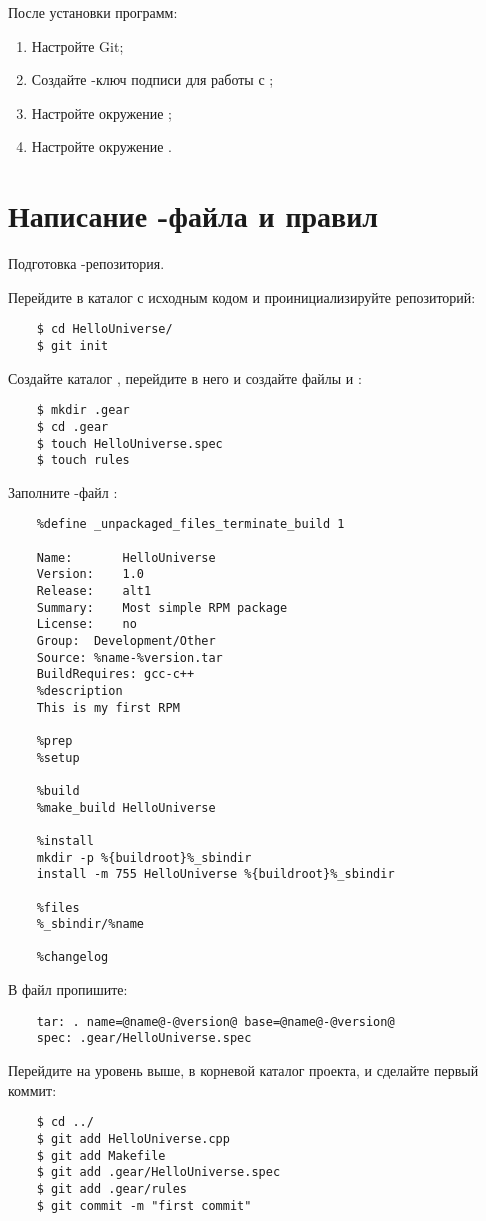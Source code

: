 После установки программ: 
\begin{enumerate}
	\item Настройте Git;
	\item Создайте -ключ подписи для работы с ;
	\item Настройте окружение ;
	\item Настройте окружение .
\end{enumerate}


\section{Написание -файла и правил }
Подготовка -репозитория.

Перейдите в каталог с исходным кодом и проинициализируйте репозиторий: 
\begin{verbatim}
	$ cd HelloUniverse/
	$ git init	
\end{verbatim}

Создайте каталог , перейдите в него и создайте файлы  и :
\begin{verbatim}
	$ mkdir .gear
	$ cd .gear
	$ touch HelloUniverse.spec
	$ touch rules
\end{verbatim} 

Заполните -файл :
\begin{verbatim}
	%define _unpackaged_files_terminate_build 1
	
	Name:       HelloUniverse
	Version:    1.0
	Release:    alt1
	Summary:    Most simple RPM package
	License:    no
	Group:	Development/Other
	Source: %name-%version.tar
	BuildRequires: gcc-c++
	%description
	This is my first RPM
	
	%prep
	%setup
	
	%build
	%make_build HelloUniverse
	
	%install
	mkdir -p %{buildroot}%_sbindir
	install -m 755 HelloUniverse %{buildroot}%_sbindir
	
	%files
	%_sbindir/%name
	
	%changelog
\end{verbatim} 

В файл  пропишите:
\begin{verbatim}
	tar: . name=@name@-@version@ base=@name@-@version@
	spec: .gear/HelloUniverse.spec
\end{verbatim} 

Перейдите на уровень выше, в корневой каталог проекта, и сделайте первый коммит: 
\begin{verbatim}
	$ cd ../ 
	$ git add HelloUniverse.cpp
	$ git add Makefile
	$ git add .gear/HelloUniverse.spec
	$ git add .gear/rules
	$ git commit -m "first commit"
\end{verbatim}

